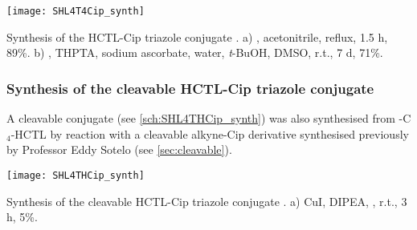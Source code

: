 \begin{scheme}[H]
	\begin{center}
		\texttt{[image: SHL4T4Cip\_synth]}
		\caption{
			Synthesis of the HCTL-Cip triazole conjugate .
			a) , acetonitrile, reflux, 1.5 h, 89\%.
			b) , THPTA, sodium ascorbate, water, \textit{t}-BuOH, DMSO, r.t., 7 d, 71\%.
			\label{sch:SHL4T4Cip_synth}}
	\end{center}
\end{scheme}

\subsubsection{Synthesis of the cleavable HCTL-Cip triazole conjugate }

A cleavable conjugate  (see \ref{sch:SHL4THCip_synth}) was also synthesised from -C$_4$-HCTL  by reaction with a cleavable alkyne-Cip derivative  synthesised previously by Professor Eddy Sotelo (see \ref{sec:cleavable}).

\begin{scheme}[H]
	\begin{center}
		\texttt{[image: SHL4THCip\_synth]}
		\caption{
			Synthesis of the cleavable HCTL-Cip triazole conjugate .
			a) CuI, DIPEA, , r.t., 3 h, 5\%.
			\label{sch:SHL4THCip_synth}}
	\end{center}
\end{scheme}